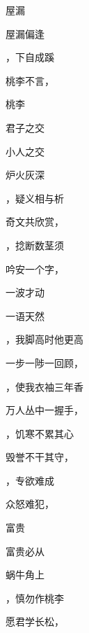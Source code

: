 \documentclass[12pt, a4paper, addpoints]{exam}
\begin{document}
\begin{multicols}{2}
\begin{questions}
\question[2] 

\question[2] 屋漏

\question[2] 屋漏偏逢\fillin

\question[2] \fillin，下自成蹊

\question[2] 桃李不言，\fillin

\question[2] 

\question[2] 桃李\fillin

\question[2] 

\question[2] 君子之交\fillin

\question[2] 

\question[2] 小人之交\fillin

\question[2] 

\question[2] 炉火灰深\fillin

\question[2] \fillin，疑义相与析

\question[2] 奇文共欣赏，\fillin

\question[2] \fillin，捻断数茎须

\question[2] 吟安一个字，\fillin

\question[2] 

\question[2] 一波才动\fillin

\question[2] 

\question[2] 一语天然\fillin

\question[2] \fillin，我脚高时他更高

\question[2] 一步一陟一回顾，\fillin

\question[2] \fillin，使我衣袖三年香

\question[2] 万人丛中一握手，\fillin

\question[2] \fillin，饥寒不累其心

\question[2] 毁誉不干其守，\fillin

\question[2] \fillin，专欲难成

\question[2] 众怒难犯，\fillin

\question[2] 

\question[2] 富贵

\question[2] 富贵必从\fillin

\question[2] 

\question[2] 蜗牛角上\fillin

\question[2] \fillin，慎勿作桃李

\question[2] 愿君学长松，\fillin

\question[2] 


\end{questions}
\end{multicols}
\end{document}
